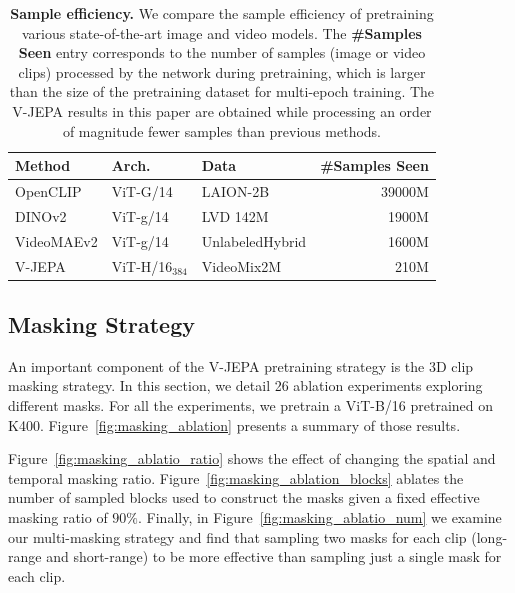 \documentclass[twocolumn]{fairmeta}
\newcommand{\putalg}{{\small V-JEPA}\xspace}
\theoremstyle{plain}
\theoremstyle{definition}
\theoremstyle{remark}
\begin{document}
\begin{table}[h]
    \centering
    \caption{\small{\bf Sample efficiency.} We compare the sample efficiency of pretraining various state-of-the-art image and video models. The {\bf \#Samples Seen} entry corresponds to the number of samples (image or video clips) processed by the network during pretraining, which is larger than the size of the pretraining dataset for multi-epoch training. The \putalg results in this paper are obtained while processing an order of magnitude fewer samples than previous methods.}
    \label{tab:samples}
    {\fontsize{8.5pt}{8.5pt}\selectfont
    \begin{tabular}{l l l | r}
         \bf Method & \bf Arch. & \bf Data & \bf \#Samples Seen  \\\toprule
         OpenCLIP & ViT-G/14 & LAION-2B & 39000M \\
         DINOv2 & ViT-g/14 & LVD 142M & 1900M \\
         VideoMAEv2 & ViT-g/14 & UnlabeledHybrid & 1600M \\
         V-JEPA & ViT-H/16$_{384}$ & VideoMix2M & 210M
    \end{tabular}}
\end{table}


\subsection{Masking Strategy}
\label{app:masking_ablation}


An important component of the \putalg pretraining strategy is the 3D clip masking strategy. In this section, we detail 26 ablation experiments exploring different masks. For all the experiments, we pretrain a ViT-B/16 pretrained on K400. Figure~\ref{fig:masking_ablation} presents a summary of those results.

Figure~\ref{fig:masking_ablatio_ratio} shows the effect of changing the spatial and temporal masking ratio.
Figure~\ref{fig:masking_ablation_blocks} ablates the number of sampled blocks used to construct the masks given a fixed effective masking ratio of $90\%$.
Finally, in Figure~\ref{fig:masking_ablatio_num} we examine our multi-masking strategy and find that sampling two masks for each clip (long-range and short-range) to be more effective than sampling just a single mask for each clip.
\end{document}
